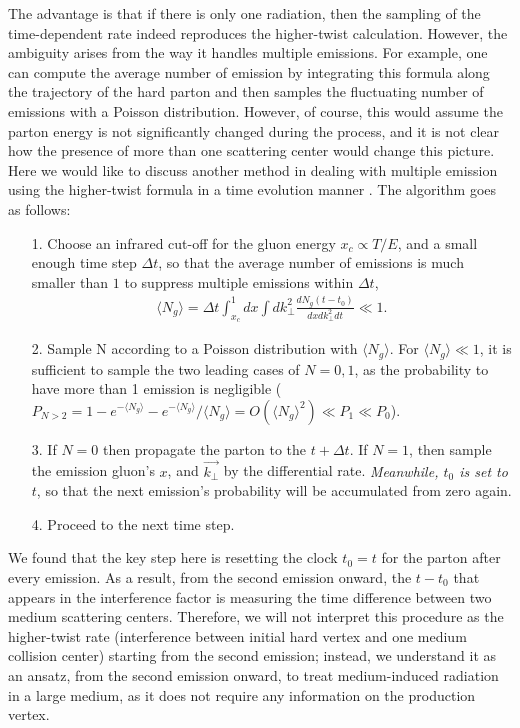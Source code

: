 The advantage is that if there is only one radiation, then the sampling of the time-dependent rate indeed reproduces the higher-twist calculation.
However, the ambiguity arises from the way it handles multiple emissions.
For example, one can compute the average number of emission by integrating this formula along the trajectory of the hard parton and then samples the fluctuating number of emissions with a Poisson distribution.
However, of course, this would assume the parton energy is not significantly changed during the process, and it is not clear how the presence of more than one scattering center would change this picture.
Here we would like to discuss another method in dealing with multiple emission using the higher-twist formula in a time evolution manner \cite{Cao:2013ita}.
The algorithm goes as follows:
\begin{itemize}
\item[1.] Choose an infrared cut-off for the gluon energy $x_c \propto T/E$, and a small enough time step $\Delta t$, so that the average number of emissions is much smaller than $1$ to suppress multiple emissions within $\Delta t$,
\begin{eqnarray}
\langle N_g \rangle = \Delta t \int_{x_c}^1 dx \int dk_\perp^2 \frac{dN_g(t-t_0)}{dx dk_\perp^2 dt} \ll 1.
\end{eqnarray}
\item[2.] Sample N according to a Poisson distribution with $\langle N_g \rangle$. For $\langle N_g \rangle \ll 1$, it is sufficient to sample the two leading cases of $N=0, 1$, as the probability to have more than 1 emission is negligible ($P_{N>2} = 1-e^{-\langle N_g \rangle}-e^{-\langle N_g \rangle}/\langle N_g \rangle = O(\langle N_g \rangle^2) \ll P_1 \ll P_0$).
\item[3.] If $N=0$ then propagate the parton to the $t+\Delta t$. If $N=1$, then sample the emission gluon's $x$, and $\vec{k_\perp}$ by the differential rate. {\it Meanwhile, $t_0$ is set to $t$}, so that the next emission's probability will be accumulated from zero again.
\item[4.] Proceed to the next time step.
\end{itemize}
We found that the key step here is resetting the clock $t_0 = t$ for the parton after every emission.
As a result, from the second emission onward, the $t-t_0$ that appears in the interference factor is measuring the time difference between two medium scattering centers.
Therefore, we will not interpret this procedure as the higher-twist rate (interference between initial hard vertex and one medium collision center) starting from the second emission;
instead, we understand it as an ansatz, from the second emission onward, to treat medium-induced radiation in a large medium, as it does not require any information on the production vertex.

